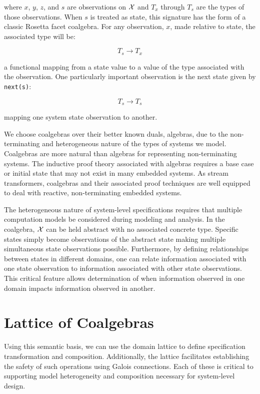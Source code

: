 \documentclass[12pt]{article}
\begin{document}
\noindent where $x$, $y$, $z$, and $s$ are observations on $\mathcal X$
and $T_x$ through $T_s$ are the types of those observations.  When $s$
is treated as state, this signature has the form of a classic Rosetta
facet coalgebra.  For any observation, $x$, made relative to state,
the associated type will be:

\[T_s\rightarrow T_x\]

\noindent a functional mapping from a state value to a value of the type
associated with the observation.  One particularly important
observation is the next state given by \lstinline!next(s)!:

\[T_s\rightarrow T_s\]

\noindent mapping one system state observation to another.

We choose coalgebras over their better known duals, algebras, due to
the non-terminating and heterogeneous nature of the types of systems
we model.  Coalgebras are more natural than algebras for representing
non-terminating systems.  The inductive proof theory associated with
algebras requires a base case or initial state that may not exist in
many embedded systems.  As stream transformers, coalgebras and their
associated proof techniques are well equipped to deal with reactive,
non-terminating embedded systems.

The heterogeneous nature of system-level specifications requires that
multiple computation models be considered during modeling and
analysis.  In the coalgebra, $\mathcal X$ can be held abstract with no
associated concrete type.  Specific states simply become observations
of the abstract state making multiple simultaneous state observations
possible.  Furthermore, by defining relationships between states in
different domains, one can relate information associated with one
state observation to information associated with other state
observations.  This critical feature allows determination of when
information observed in one domain impacts information observed in
another.

\section{Lattice of Coalgebras}

Using this semantic basis, we can use the domain lattice to define
specification transformation and composition.  Additionally, the
lattice facilitates establishing the safety of such operations using
Galois connections.  Each of these is critical to supporting model
heterogeneity and composition necessary for system-level design.
\end{document}
